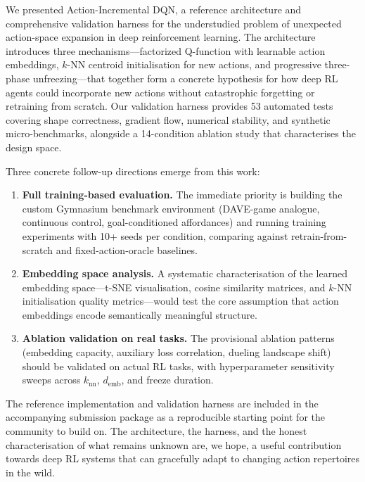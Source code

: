 \documentclass{article}
\begin{document}
We presented Action-Incremental DQN, a reference architecture and
comprehensive validation harness for the understudied problem of unexpected
action-space expansion in deep reinforcement learning. The architecture
introduces three mechanisms---factorized Q-function with learnable action
embeddings, $k$-NN centroid initialisation for new actions, and progressive
three-phase unfreezing---that together form a concrete hypothesis for how deep
RL agents could incorporate new actions without catastrophic forgetting or
retraining from scratch. Our validation harness provides 53 automated tests
covering shape correctness, gradient flow, numerical stability, and synthetic
micro-benchmarks, alongside a 14-condition ablation study that characterises
the design space.

Three concrete follow-up directions emerge from this work:

\begin{enumerate}
  \item \textbf{Full training-based evaluation.} The immediate priority is
  building the custom Gymnasium benchmark environment (DAVE-game analogue,
  continuous control, goal-conditioned affordances) and running training
  experiments with 10+ seeds per condition, comparing against
  retrain-from-scratch and fixed-action-oracle baselines.
  \item \textbf{Embedding space analysis.} A systematic characterisation of
  the learned embedding space---t-SNE visualisation, cosine similarity
  matrices, and $k$-NN initialisation quality metrics---would test the core
  assumption that action embeddings encode semantically meaningful structure.
  \item \textbf{Ablation validation on real tasks.} The provisional ablation
  patterns (embedding capacity, auxiliary loss correlation, dueling landscape
  shift) should be validated on actual RL tasks, with hyperparameter
  sensitivity sweeps across $k_\text{nn}$, $d_\text{emb}$, and freeze duration.
\end{enumerate}

The reference implementation and validation harness are included in the
accompanying submission package as a reproducible starting point for the
community to build on. The architecture, the harness, and the honest
characterisation of what remains unknown are, we hope, a useful contribution
towards deep RL systems that can gracefully adapt to changing action
repertoires in the wild.


\end{document}
